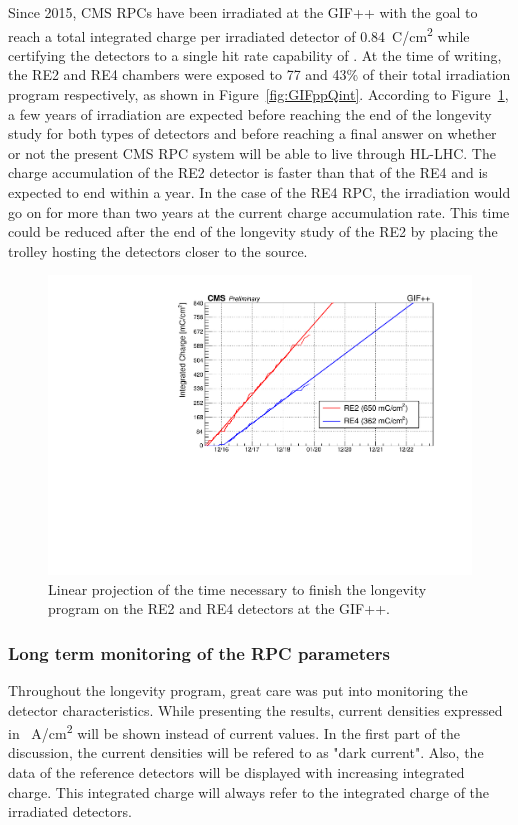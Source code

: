    Since 2015, CMS RPCs have been irradiated at the GIF++ with the goal to reach a total integrated charge per irradiated detector of \SI{0.84}{C/cm^2} while certifying the detectors to a single hit rate capability of . At the time of writing, the RE2 and RE4 chambers were exposed to 77 and 43\% of their total irradiation program respectively, as shown in Figure~\ref{fig:GIFppQint}. According to Figure~\ref{fig:GIFppQint-Extrapol}, a few years of irradiation are expected before reaching the end of the longevity study for both types of detectors and before reaching a final answer on whether or not the present CMS RPC system will be able to live through HL-LHC. The charge accumulation of the RE2 detector is faster than that of the RE4 and is expected to end within a year. In the case of the RE4 RPC, the irradiation would go on for more than two years at the current charge accumulation rate. This time could be reduced after the end of the longevity study of the RE2 by placing the trolley hosting the detectors closer to the source.
    
\endgroup
\newpage
	
	\begin{figure}[H]
        \centering
		\includegraphics[width = 0.7\linewidth]{fig/chapt5/Qint-vs-Time-Extrapolation.pdf}
		\caption{\label{fig:GIFppQint-Extrapol} Linear projection of the time necessary to finish the longevity program on the RE2 and RE4 detectors at the GIF++.}
	\end{figure}
	
		\subsubsection{Long term monitoring of the RPC parameters}
		\label{chapt5:sssec:longterm}
	
	Throughout the longevity program, great care was put into monitoring the detector characteristics. While presenting the results, current densities expressed in \si{\mu A/cm^2} will be shown instead of current values. In the first part of the discussion, the current densities will be refered to as "dark current". Also, the data of the reference detectors will be displayed with increasing integrated charge. This integrated charge will always refer to the integrated charge of the irradiated detectors.

